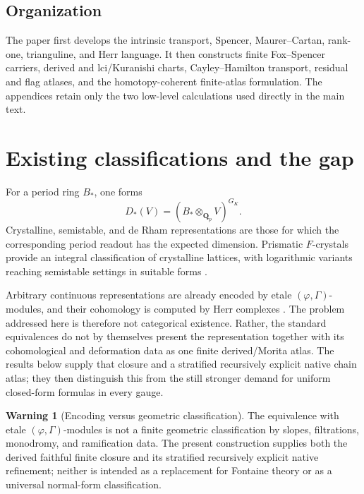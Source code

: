 \documentclass[11pt]{article}
\theoremstyle{definition}
\newtheorem{warning}[theorem]{Warning}
\newcommand{\Qp}{\mathbf Q_p}
\newcommand{\GK}{G_K}
\begin{document}
\subsection{Organization}

The paper first develops the intrinsic transport, Spencer, Maurer--Cartan, rank-one, trianguline, and Herr language.  It then constructs finite Fox--Spencer carriers, derived and lci/Kuranishi charts, Cayley--Hamilton transport, residual and flag atlases, and the homotopy-coherent finite-atlas formulation.  The appendices retain only the two low-level calculations used directly in the main text.


\section{Existing classifications and the gap}

For a period ring $B_*$, one forms
\[
D_*(V)=(B_*\otimes_{\Qp}V)^{\GK}.
\]
Crystalline, semistable, and de Rham representations are those for which the corresponding period readout has the expected dimension.  Prismatic $F$-crystals provide an integral classification of crystalline lattices, with logarithmic variants reaching semistable settings in suitable forms \cite{BhattScholzePFC,DuLiuPrismatic}.

Arbitrary continuous representations are already encoded by etale $(\varphi,\Gamma)$-modules, and their cohomology is computed by Herr complexes \cite{FontaineLocal,CherbonnierColmez,HerrSurvey,LiuCohomology,KPXFamilies}.  The problem addressed here is therefore not categorical existence.  Rather, the standard equivalences do not by themselves present the representation together with its cohomological and deformation data as one finite derived/Morita atlas.  The results below supply that closure and a stratified recursively explicit native chain atlas; they then distinguish this from the still stronger demand for uniform closed-form formulas in every gauge.

\begin{warning}[Encoding versus geometric classification]
The equivalence with etale $(\varphi,\Gamma)$-modules is not a finite geometric classification by slopes, filtrations, monodromy, and ramification data.  The present construction supplies both the derived faithful finite closure and its stratified recursively explicit native refinement; neither is intended as a replacement for Fontaine theory or as a universal normal-form classification.
\end{warning}
\end{document}
